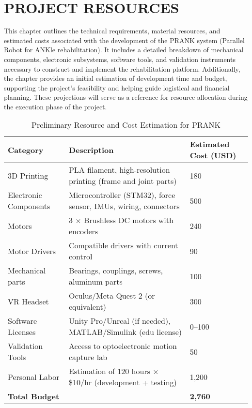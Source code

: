 \chapter{PROJECT RESOURCES}\label{projects_resources}
\graphicspath{{images/}}
This chapter outlines the technical requirements, material resources, and estimated costs associated with the development of the PRANK system (Parallel Robot for ANKle rehabilitation). It includes a detailed breakdown of mechanical components, electronic subsystems, software tools, and validation instruments necessary to construct and implement the rehabilitation platform. Additionally, the chapter provides an initial estimation of development time and budget, supporting the project's feasibility and helping guide logistical and financial planning. These projections will serve as a reference for resource allocation during the execution phase of the project.

\begin{table}[H]
\centering
\caption{Preliminary Resource and Cost Estimation for PRANK}
\begin{tabular}{|p{4cm}|p{5.5cm}|p{2.5cm}|}
\hline
\rowcolor{Gray}
\textbf{Category} & \textbf{Description} & \textbf{Estimated Cost (USD)} \\
\hline
3D Printing & PLA filament, high-resolution printing (frame and joint parts) & 180 \\
\hline
Electronic Components & Microcontroller (STM32), force sensor, IMUs, wiring, connectors & 500 \\
\hline
Motors & 3 × Brushless DC motors with encoders & 240 \\
\hline
Motor Drivers & Compatible drivers with current control & 90 \\
\hline
Mechanical parts & Bearings, couplings, screws, aluminum parts & 100 \\
\hline
VR Headset & Oculus/Meta Quest 2 (or equivalent) & 300 \\
\hline
Software Licenses & Unity Pro/Unreal (if needed), MATLAB/Simulink (edu license) & 0--100 \\
\hline
Validation Tools & Access to optoelectronic motion capture lab  & 50 \\
\hline
Personal Labor & Estimation of 120 hours × \$10/hr (development + testing) & 1,200 \\
\hline
\textbf{Total Budget} & & \textbf{2,760} \\
\hline
\end{tabular}
\end{table}